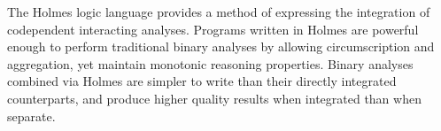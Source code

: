 %
%


The Holmes logic language provides a method of expressing the integration of codependent interacting analyses.
Programs written in Holmes are powerful enough to perform traditional binary analyses by allowing circumscription and aggregation, yet maintain monotonic reasoning properties.
Binary analyses combined via Holmes are simpler to write than their directly integrated counterparts, and produce higher quality results when integrated than when separate.


